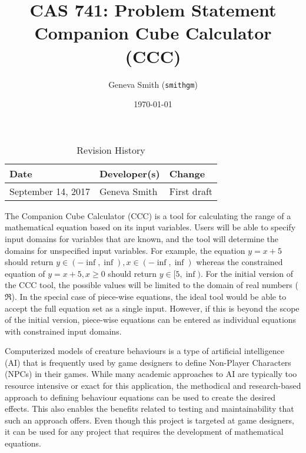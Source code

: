 \documentclass{article}
\title{CAS 741: Problem Statement\\Companion Cube Calculator (CCC)}
\author{Geneva Smith (\texttt{smithgm})}
\date{\today}
\begin{document}
\maketitle

\begin{table}[hp]
\caption{Revision History} \label{TblRevisionHistory}
\begin{tabularx}{\textwidth}{llX}
\toprule
\textbf{Date} & \textbf{Developer(s)} & \textbf{Change}\\
\midrule
September 14, 2017 & Geneva Smith & First draft \\
\bottomrule
\end{tabularx}
\end{table}

The Companion Cube Calculator (CCC) is a tool for calculating the range of a 
mathematical equation based on its input variables. Users will be able to 
specify input domains for variables that are known, and the tool will determine 
the domains for unspecified input variables. For example, the equation $y = x + 
5$ should return $y \in (-\inf, \inf), x \in (-\inf, \inf)$ whereas the 
constrained equation of $y = x + 5, x \geq 0$ should return $y \in 
[5, \inf)$. For the initial version of the CCC tool, the possible values will 
be limited to the domain of real numbers ($\Re$). In the special case of 
piece-wise equations, the ideal tool would be able to accept the full equation 
set as a single input. However, if this is beyond the scope of the initial 
version, piece-wise equations can be entered as individual equations with 
constrained input domains.

Computerized models of creature behaviours is a type of artificial intelligence 
(AI) that is frequently used by game designers to define Non-Player Characters 
(NPCs) in their games. While many academic approaches to AI are typically too 
resource intensive or exact for this application, the methodical and 
research-based approach to defining behaviour equations can be used to create 
the desired effects. This also enables the benefits related to testing and 
maintainability that such an approach offers. Even though this project is 
targeted at game designers, it can be used for any project that requires the 
development of mathematical equations.
\end{document}
